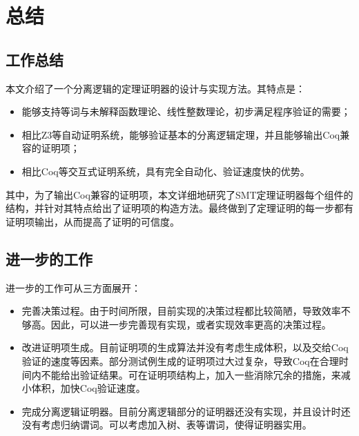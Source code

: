 \chapter{总结}
\label{chap:end}

\section{工作总结}
本文介绍了一个分离逻辑的定理证明器的设计与实现方法。其特点是：
\begin{itemize}
  \item 能够支持等词与未解释函数理论、线性整数理论，初步满足程序验证的需要；
  \item 相比Z3等自动证明系统，能够验证基本的分离逻辑定理，并且能够输出Coq兼容的证明项；
  \item 相比Coq等交互式证明系统，具有完全自动化、验证速度快的优势。
\end{itemize}

其中，为了输出Coq兼容的证明项，本文详细地研究了SMT定理证明器每个组件的结构，并针对其特点给出了证明项的构造方法。最终做到了定理证明的每一步都有证明项输出，从而提高了证明的可信度。

\section{进一步的工作}
进一步的工作可从三方面展开：
\begin{itemize}
  \item 完善决策过程。由于时间所限，目前实现的决策过程都比较简陋，导致效率不够高。因此，可以进一步完善现有实现，或者实现效率更高的决策过程。
  \item 改进证明项生成。目前证明项的生成算法并没有考虑生成体积，以及交给Coq验证的速度等因素。部分测试例生成的证明项过大过复杂，导致Coq在合理时间内不能给出验证结果。可在证明项结构上，加入一些消除冗余的措施，来减小体积，加快Coq验证速度。
  \item 完成分离逻辑证明器。目前分离逻辑部分的证明器还没有实现，并且设计时还没有考虑归纳谓词。可以考虑加入树、表等谓词，使得证明器实用。
\end{itemize}


